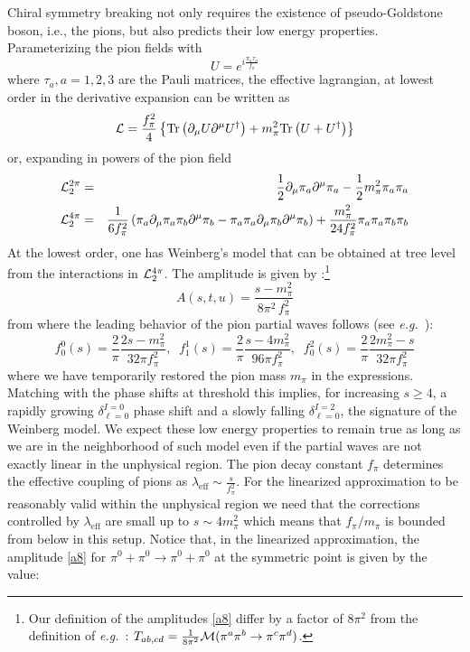 \documentclass[12pt,letterpaper]{article}
\newcommand{\eg}{{\it e.g.}}
\newcommand{\tr}{\mbox{Tr}}
\newcommand{\beq}{\begin{equation}}
\newcommand{\eeq}{\end{equation}}
\newcommand{\beqa}{\begin{eqnarray}}
\newcommand{\eeqa}{\end{eqnarray}}
\newcommand{\cM}{{\cal M}}
\newcommand{\cL}{{\cal L}}
\newcommand{\half}{\ensuremath{\frac{1}{2}}}
\begin{document}
Chiral symmetry breaking not only requires the existence of pseudo-Goldstone boson, i.e., the pions, but also predicts their low energy properties. Parameterizing the pion fields with
\begin{equation}
U=e^{i\frac{\pi_a\tau_a}{f_\pi}}
\end{equation}
where $\tau_a, a=1,2,3$ are the Pauli matrices, the effective lagrangian, at lowest order in the derivative expansion can be written as \cite{GASSER198765,GASSER1984142,donoghue_golowich_holstein_2014}
\beq
 \cL = \frac{f_\pi^2}{4}\left\{\tr\left(\partial_\mu U \partial^\mu U^\dagger\right)+ m_\pi^2\tr\left(U+U^\dagger\right)\right\} 
\eeq
or, expanding in powers of the pion field
\beqa 
 \cL_2^{2\pi}   &=& \half \partial_\mu \pi_a \partial^\mu \pi_a - \half m_\pi^2 \pi_a \pi_a  \\ 
 \cL_2^{4\pi}   &=& \frac{1}{6f_\pi^2}\left(\pi_a\partial_\mu\pi_a\pi_b\partial^\mu\pi_b-\pi_a\pi_a\partial_\mu\pi_b\partial^\mu\pi_b\right)+\frac{m_\pi^2}{24f_\pi^2}\pi_a\pi_a\pi_b\pi_b
\eeqa
At the lowest order, one has Weinberg's model that can be obtained at tree level from the interactions in $\cL_2^{4\pi}$. The amplitude is given by \cite{PhysRevLett.17.616,GASSER198765,GASSER1984142,donoghue_golowich_holstein_2014}:\footnote{Our definition of the amplitudes \eqref{a8} differ by a factor of $8\pi^2$ from the definition of \eg\ \cite{Peskin:1995ev}: $T_{ab,cd}=\frac{1}{8\pi^2}\cM(\pi^a\pi^b\to\pi^c\pi^d)$.}
\beq\label{h5}
 A(s,t,u) =  \frac{s-m_{\pi}^2}{8\pi^2\,f_\pi^2}
\eeq
from where the leading behavior of the pion partial waves follows (see \eg\ \cite{donoghue_golowich_holstein_2014}):
\begin{equation}\label{chiralratio}
f^0_0(s)=\frac{2}{\pi}\frac{2s-m_{\pi}^2}{32\pi f_{\pi}^2},\;\; f^1_1(s)=\frac{2}{\pi}\frac{s-4m_{\pi}^2}{96\pi f_{\pi}^2},\;\; f^2_0(s)=\frac{2}{\pi}\frac{2m_{\pi}^2-s}{32\pi f_{\pi}^2}
\end{equation}
where we have temporarily restored the pion mass $m_{\pi}$ in the expressions.
Matching with the phase shifts at threshold this implies, for increasing $s\ge 4$, a rapidly growing $\delta_{\ell=0}^{I=0}$ phase shift and a slowly falling $\delta_{\ell=0}^{I=2}$, the signature of the Weinberg model. We expect these low energy properties to remain true as long as we are in the neighborhood of such model even if the partial waves are not exactly linear in the unphysical region.      
The pion decay constant $f_\pi$ determines the effective coupling of pions as $\lambda_{\text{eff}} \sim \frac{s}{f_\pi^2}$. For the linearized approximation to be reasonably valid within the unphysical region we need that the corrections controlled by $\lambda_{\text{eff}}$ are small up to $s\sim 4 m_\pi^2$ which means that $f_\pi/m_\pi$ is bounded from below in this setup. Notice that, in the linearized approximation, the amplitude \eqref{a8} for $\pi^0+\pi^0\rightarrow \pi^0+\pi^0$ at the symmetric point is given by the value:
\end{document}
